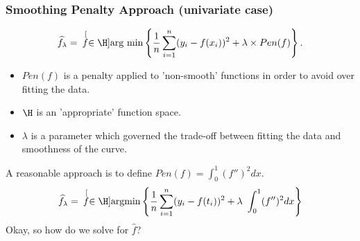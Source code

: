 




\begin{frame}
\frametitle{Smoothing Penalty Approach (univariate case)}
\begin{equation*}
\widehat{f}_{\lambda} = \hspace{.07in}\stackrel[f \in \H]{}{\mbox{arg min}} \left\{ \frac{1}{n}\sum_{i=1}^{n}(y_i - f(x_i))^2 + \lambda\times Pen(f) \right\}.
\label{eq:PLS_norm}
\end{equation*}
\begin{itemize}
\item $Pen(f)$ is a penalty applied to 'non-smooth' functions in order to avoid over fitting the data.
\item $\H$ is an 'appropriate' function space.
\item $\lambda$ is a parameter which governed the trade-off between fitting the data and smoothness of the curve.
\end{itemize}
A reasonable approach is to define $Pen(f) = \int_0^1 (f'')^2dx$. 
\begin{equation*}
\widehat{f}_{\lambda} = \hspace{.07in}\stackrel[f \in \H]{}{\mbox{argmin}} \left\{ \frac{1}{n}\sum_{i=1}^{n}(y_i - f(t_i))^2 + \lambda\ \int_0^1(f'')^2dx \right\}
\label{eq:unpenalized objective function}
\end{equation*}
Okay, so how do we solve for $\hat{f}$?
\end{frame}

